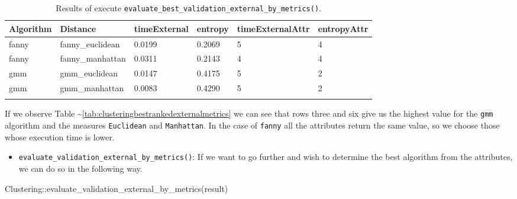 \documentclass[
]{article}
\newenvironment{Shaded}{\begin{snugshade}}{\end{snugshade}}
\newcommand{\FunctionTok}[1]{\textcolor[rgb]{0.00,0.00,0.00}{#1}}
\newcommand{\NormalTok}[1]{#1}
\newcommand{\SpecialCharTok}[1]{\textcolor[rgb]{0.00,0.00,0.00}{#1}}
\providecommand{\tightlist}{%
  \setlength{\itemsep}{0pt}\setlength{\parskip}{0pt}}
\begin{document}
\newpage
\begin{longtable}{| p{1.2cm} | p{2.2cm} |  p{1.8cm} | p{0.8cm} | p{2.1cm} | p{1.9cm} |}
\hline
\scriptsize  Algorithm & \scriptsize    Distance     & \scriptsize timeExternal & \scriptsize entropy & \scriptsize timeExternalAttr & \scriptsize entropyAttr \\
\hline
\scriptsize   fanny    & \scriptsize fanny\_euclidean & \scriptsize    0.0199    & \scriptsize  0.2069 & \scriptsize        5         & \scriptsize     4 \\
\cline{2-6}
\scriptsize   fanny    & \scriptsize fanny\_manhattan & \scriptsize    0.0311    & \scriptsize  0.2143 & \scriptsize        4         & \scriptsize     4 \\
\hline
\scriptsize    gmm     & \scriptsize  gmm\_euclidean  & \scriptsize    0.0147    & \scriptsize  0.4175 & \scriptsize        5         & \scriptsize     2 \\
\cline{2-6}
\scriptsize    gmm     & \scriptsize  gmm\_manhattan  & \scriptsize    0.0083    & \scriptsize   0.4290 & \scriptsize        5         & \scriptsize     2 \\
\hline
\caption{Results of execute \texttt{evaluate\_best\_validation\_external\_by\_metrics()}.}
\label{tab:evaluatebestvalidationexternalbymetrics}
\end{longtable}

If we observe Table
\textasciitilde{}\ref{tab:clusteringbestrankedexternalmetrics} we can
see that rows three and six give us the highest value for the
\texttt{gmm} algorithm and the measures \texttt{Euclidean} and
\texttt{Manhattan}. In the case of \texttt{fanny} all the attributes
return the same value, so we choose those whose execution time is lower.

\begin{itemize}
\tightlist
\item
  \texttt{evaluate\_validation\_external\_by\_metrics()}: If we want to
  go further and wish to determine the best algorithm from the
  attributes, we can do so in the following way.
\end{itemize}

\begin{Shaded}
\begin{Highlighting}[]
\NormalTok{Clustering}\SpecialCharTok{::}\FunctionTok{evaluate\_validation\_external\_by\_metrics}\NormalTok{(result)}
\end{Highlighting}
\end{Shaded}
\end{document}
